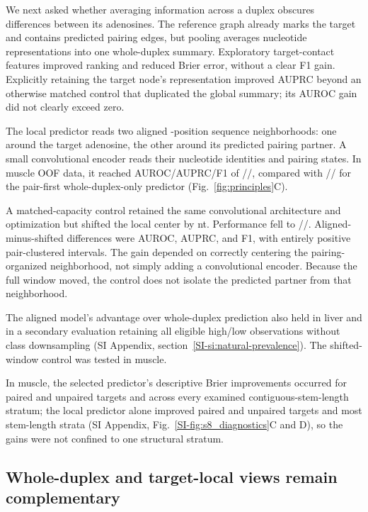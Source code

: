 \documentclass[9pt,twocolumn,twoside]{pnas-new}
\newcommand{\SIref}[1]{\ref*{SI-#1}}
\begin{document}
We next asked whether averaging information across a duplex obscures differences between its adenosines. The reference graph already marks the target and contains predicted pairing edges, but pooling averages nucleotide representations into one whole-duplex summary. Exploratory target-contact features improved ranking and reduced Brier error, without a clear F1 gain. Explicitly retaining the target node's representation improved AUPRC beyond an otherwise matched control that duplicated the global summary; its AUROC gain did not clearly exceed zero.

The local predictor reads two aligned \LocalWindowWidth{}-position sequence neighborhoods: one around the target adenosine, the other around its predicted pairing partner. A small convolutional encoder reads their nucleotide identities and pairing states. In muscle OOF data, it reached AUROC/AUPRC/F1 of \MuscleLocalAUROC{}/\MuscleLocalAUPRC{}/\MuscleLocalFOne{}, compared with \MusclePairAUROC{}/\MusclePairAUPRC{}/\MusclePairFOne{} for the pair-first whole-duplex-only predictor (Fig.~\ref{fig:principles}C).

A matched-capacity control retained the same convolutional architecture and optimization but shifted the local center by \LocalControlShift{} nt. Performance fell to \MuscleShiftedAUROC{}/\MuscleShiftedAUPRC{}/\MuscleShiftedFOne{}. Aligned-minus-shifted differences were \AlignedMinusShiftedAUROCMedian{} AUROC, \AlignedMinusShiftedAUPRCMedian{} AUPRC, and \AlignedMinusShiftedFOneMedian{} F1, with entirely positive pair-clustered intervals. The gain depended on correctly centering the pairing-organized neighborhood, not simply adding a convolutional encoder. Because the full window moved, the control does not isolate the predicted partner from that neighborhood.

The aligned model's advantage over whole-duplex prediction also held in liver and in a secondary evaluation retaining all eligible high/low observations without class downsampling (SI Appendix, section~\SIref{si:natural-prevalence}). The shifted-window control was tested in muscle.

In muscle, the selected predictor's descriptive Brier improvements occurred for paired and unpaired targets and across every examined contiguous-stem-length stratum; the local predictor alone improved paired and unpaired targets and most stem-length strata (SI Appendix, Fig.~\SIref{fig:s8_diagnostics}C and D), so the gains were not confined to one structural stratum.

\subsection*{Whole-duplex and target-local views remain complementary}
\end{document}

